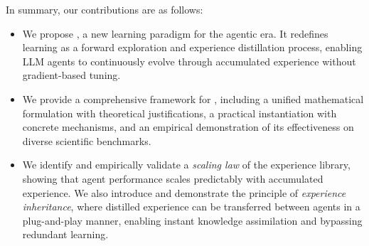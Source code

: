 In summary, our contributions are as follows:
\begin{itemize}
\item We propose \textbf{\method{}}, a new learning paradigm for the agentic era. It redefines learning as a forward exploration and experience distillation process, enabling LLM agents to continuously evolve through accumulated experience without gradient-based tuning.
\item We provide a comprehensive framework for \method{}, including a unified mathematical formulation with theoretical justifications, a practical instantiation with concrete mechanisms, and an empirical demonstration of its effectiveness on diverse scientific benchmarks.
\item We identify and empirically validate a \textit{scaling law} of the experience library, showing that agent performance scales predictably with accumulated experience. %
We also introduce and demonstrate the principle of \textit{experience inheritance}, where distilled experience can be transferred between agents in a plug-and-play manner, enabling instant knowledge assimilation and bypassing redundant learning.
\end{itemize}